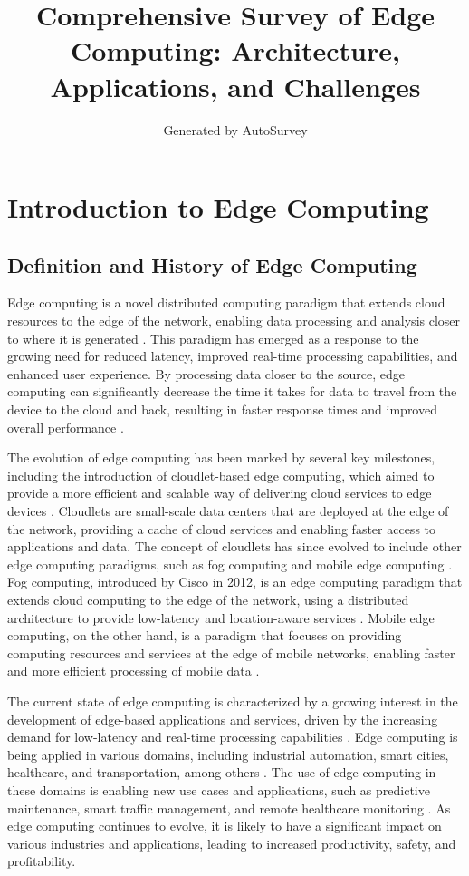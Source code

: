 \documentclass[11pt]{article}
\title{Comprehensive Survey of Edge Computing: Architecture, Applications, and Challenges}
\author{Generated by AutoSurvey}
\date{}
\begin{document}
\maketitle
\tableofcontents
\newpage

\section{Introduction to Edge Computing}

\subsection{Definition and History of Edge Computing}

Edge computing is a novel distributed computing paradigm that extends cloud resources to the edge of the network, enabling data processing and analysis closer to where it is generated \cite{ref1}. This paradigm has emerged as a response to the growing need for reduced latency, improved real-time processing capabilities, and enhanced user experience. By processing data closer to the source, edge computing can significantly decrease the time it takes for data to travel from the device to the cloud and back, resulting in faster response times and improved overall performance \cite{ref2}.

The evolution of edge computing has been marked by several key milestones, including the introduction of cloudlet-based edge computing, which aimed to provide a more efficient and scalable way of delivering cloud services to edge devices \cite{ref2}. Cloudlets are small-scale data centers that are deployed at the edge of the network, providing a cache of cloud services and enabling faster access to applications and data. The concept of cloudlets has since evolved to include other edge computing paradigms, such as fog computing and mobile edge computing \cite{ref3}. Fog computing, introduced by Cisco in 2012, is an edge computing paradigm that extends cloud computing to the edge of the network, using a distributed architecture to provide low-latency and location-aware services \cite{ref1}. Mobile edge computing, on the other hand, is a paradigm that focuses on providing computing resources and services at the edge of mobile networks, enabling faster and more efficient processing of mobile data \cite{ref3}.

The current state of edge computing is characterized by a growing interest in the development of edge-based applications and services, driven by the increasing demand for low-latency and real-time processing capabilities \cite{ref4}. Edge computing is being applied in various domains, including industrial automation, smart cities, healthcare, and transportation, among others \cite{ref2}. The use of edge computing in these domains is enabling new use cases and applications, such as predictive maintenance, smart traffic management, and remote healthcare monitoring \cite{ref3}. As edge computing continues to evolve, it is likely to have a significant impact on various industries and applications, leading to increased productivity, safety, and profitability.
\end{document}
